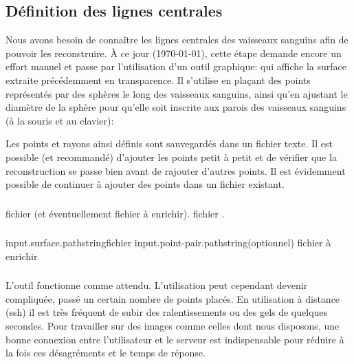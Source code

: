 	\subsection{Définition des lignes centrales}

Nous avons besoin de connaître les lignes centrales des vaisseaux sanguins afin de pouvoir les reconstruire. À ce jour (\today), cette étape demande encore un effort manuel et passe par l'utilisation d'un outil graphique:  qui affiche la surface extraite précédemment en transparence. Il s'utilise en plaçant des points représentés par des sphères le long des vaisseaux sanguins, ainsi qu'en ajustant le diamètre de la sphère pour qu'elle soit inscrite aux parois des vaisseaux sanguins (à la souris et au clavier):

\begin{figure}[H]
\begin{center}
\caption{%
}
\end{center}
\label{fig:mclgui}
\end{figure}

Les points et rayons ainsi définis sont sauvegardés dans un fichier texte. Il est possible (et recommandé) d'ajouter les points petit à petit et de vérifier que la reconstruction se passe bien avant de rajouter d'autres points. Il est évidemment possible de continuer à ajouter des points dans un fichier existant.

	\subsubsection{\ioT}

\iolist
{fichier \stl (et éventuellement fichier \pointpair à enrichir).}
{fichier \pointpair .}


	\subsubsection{\argsT}

\args
{input.surface.path}{}{string}{fichier \stl}
{input.point-pair.path}{}{string}{(optionnel) fichier \pointpair à enrichir}
\stoparg


	\subsubsection{\etatg}
	
L'outil fonctionne comme attendu. L'utilisation peut cependant devenir compliquée, passé un certain nombre de points placés. En utilisation à distance (ssh) il est très fréquent de subir des ralentissements ou des gels de quelques secondes. Pour travailler sur des images comme celles dont nous disposons, une bonne connexion entre l'utilisateur et le serveur est indispensable pour réduire à la fois ces désagréments et le temps de réponse.

